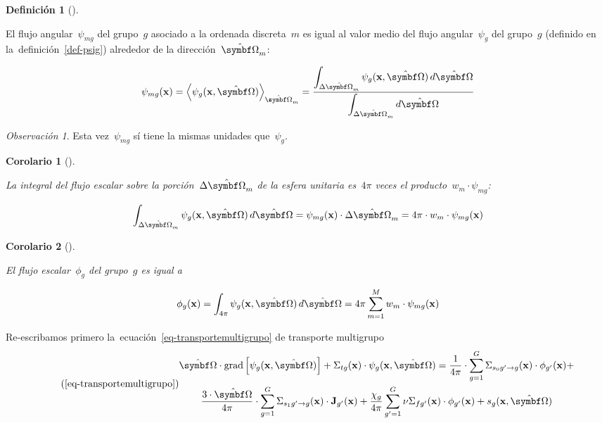 \documentclass[
  12pt,
  a4paper,
  table]{scrbook}
\theoremstyle{plain}
\theoremstyle{definition}
\newtheorem{definition}{Definición}[chapter]
\theoremstyle{plain}
\theoremstyle{plain}
\newtheorem{corollary}{Corolario}[chapter]
\theoremstyle{remark}
\newtheorem*{remark}{Observación}
\begin{document}
\begin{definition}[]\protect\hypertarget{def-psi-mg}{}\label{def-psi-mg}

El flujo angular~\(\psi_{mg}\) del grupo~\(g\) asociado a la ordenada
discreta~\(m\) es igual al valor medio del flujo angular~\(\psi_g\) del
grupo~\(g\) (definido en la~definición~\ref{def-psig}) alrededor de la
dirección~\(\omegaversor_m\):

\[
\psi_{mg}(\vec{x}) = \left\langle \psi_g(\vec{x},\omegaversor)\right\rangle_{\omegaversor_m} = \frac{ \displaystyle \int_{\Delta \omegaversor_m} \psi_g(\vec{x},\omegaversor) \, d\omegaversor}{ \displaystyle \int_{\Delta \omegaversor_m} d\omegaversor}
\]

\end{definition}

\begin{remark}

Esta vez~\(\psi_{mg}\) sí tiene la mismas unidades que~\(\psi_{g}\).

\end{remark}

\begin{corollary}[]\protect\hypertarget{cor-int-psi-g}{}\label{cor-int-psi-g}

La integral del flujo escalar sobre la porción~\(\Delta \omegaversor_m\)
de la esfera unitaria es~\(4\pi\) veces el
producto~\(w_m \cdot \psi_{mg}\):

\[
\int_{\Delta \omegaversor_m} \psi_g(\vec{x},\omegaversor) \, d\omegaversor
=
\psi_{mg}(\vec{x}) \cdot \Delta \omegaversor_m 
=
4\pi \cdot w_m \cdot \psi_{mg}(\vec{x})
\]

\end{corollary}

\begin{corollary}[]\protect\hypertarget{cor-phig-sum-psimg}{}\label{cor-phig-sum-psimg}

El flujo escalar~\(\phi_g\) del grupo~\(g\) es igual a

\[
\phi_g(\vec{x}) = \int_{4\pi} \psi_g(\vec{x}, \omegaversor) \, d\omegaversor =
4\pi \sum_{m=1}^M w_m \cdot \psi_{mg}(\vec{x})
\]

\end{corollary}

Re-escribamos primero la~ecuación~\ref{eq-transportemultigrupo} de
transporte multigrupo \[\tag{\ref{eq-transportemultigrupo}}
\begin{gathered}
 \omegaversor \cdot \text{grad} \left[ \psi_g(\vec{x}, \omegaversor) \right]  +
 \Sigma_{t g}(\vec{x}) \cdot \psi_g(\vec{x}, \omegaversor) = 
 \frac{1}{4\pi} \cdot \sum_{g=1}^G \Sigma_{s_0 g^\prime \rightarrow g}(\vec{x}) \cdot \phi_{g^\prime}(\vec{x}) + \\
 \frac{3 \cdot \omegaversor}{4\pi} \cdot \sum_{g=1}^G \Sigma_{s_1 g^\prime \rightarrow g}(\vec{x}) \cdot \vec{J}_{g^\prime}(\vec{x}) + 
 \frac{\chi_g}{4\pi} \sum_{g^\prime=1}^G \nu\Sigma_{fg^\prime}(\vec{x}) \cdot \phi_{g^\prime}(\vec{x})
+ s_g(\vec{x}, \omegaversor)
\end{gathered}
\]
\end{document}
